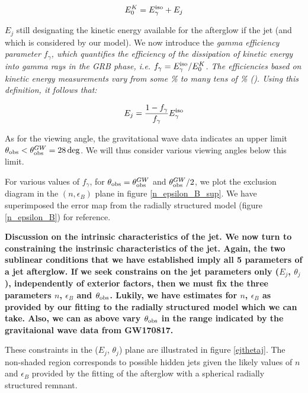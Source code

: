 $$E^K_0 = E^{\rm{iso}}_\gamma + E_j$$

$E_j$ still designating the kinetic energy available for the afterglow if the jet (and which is considered by our model). We now introduce the \it{gamma efficiency} parameter $f_\gamma$, which quantifies the efficiency of the dissipation of kinetic energy into gamma rays in the GRB phase, i.e. $f_\gamma = E^{\rm{iso}}_\gamma/E^K_0$. The efficiencies based on kinetic energy measurements vary from some \% to many tens of \% (\cite{47,48}). Using this definition, it follows that:

$$E_j = \frac{1 - f_\gamma}{f_\gamma} E^{\rm{iso}}_\gamma $$

As for the viewing angle, the gravitational wave data indicates an upper limit $\thetaobs < \thetaobs^{GW} = 28\deg$. We will thus consider various viewing angles below this limit.

For various values of $f_\gamma$, for $\thetaobs = \thetaobs^{GW}$ and $\thetaobs^{GW} / 2$, we plot the exclusion diagram in the $(n, \epsilon_B)$ plane in figure \ref{n_epsilon_B_sup}. We have superimposed the error map from the radially structured model (figure \ref{n_epsilon_B}) for reference.
 

\bf{Discussion on the intrinsic characteristics of the jet.} We now turn to constraining the instrinsic characteristics of the jet. Again, the two sublinear conditions that we have established imply all 5 parameters of a jet afterglow. If we seek constrains on the jet parameters only ($E_j$, $\theta_j$), independently of exterior factors, then we must fix the three parameters $n$, $\epsilon_B$ and $\thetaobs$. Lukily, we have estimates for $n$, $\epsilon_B$ as provided by our fitting to the radially structured model which we can take. Also, we can as above vary $\thetaobs$ in the range indicated by the gravitaional wave data from GW170817.

These constraints in the ($E_j$, $\theta_j$) plane are illustrated in figure \ref{ejthetaj}. The non-shaded region corresponds to possible hidden jets given the likely values of $n$ and $\epsilon_B$ provided by the fitting of the afterglow with a spherical radially structured remnant.


